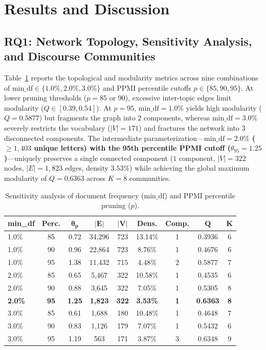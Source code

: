 \documentclass[pdflatex,sn-basic]{sn-jnl}
\begin{document}
\section{Results and Discussion}\label{sec4}
\subsection{RQ1: Network Topology, Sensitivity Analysis, and Discourse Communities}
Table~\ref{tab:sensitivity} reports the topological and modularity metrics across nine combinations of $\text{min\_df} \in \{1.0\%, 2.0\%, 3.0\%\}$ and PPMI percentile cutoffs $p \in \{85, 90, 95\}$. At lower pruning thresholds ($p=85$ or $90$), excessive inter-topic edges limit modularity ($Q \in [0.39, 0.54]$). At $p=95$, $\text{min\_df}=1.0\%$ yields high modularity ($Q=0.5877$) but fragments the graph into $2$ components, whereas $\text{min\_df}=3.0\%$ severely restricts the vocabulary ($|V|=171$) and fractures the network into $3$ disconnected components. The intermediate parameterization---\textbf{$\text{min\_df}=2.0\%$ ($\ge 1,403$ unique letters) with the 95th percentile PPMI cutoff ($\theta_{95}=1.25$)}---uniquely preserves a single connected component ($1$ component, $|V|=322$ nodes, $|E|=1,823$ edges, density $3.53\%$) while achieving the global maximum modularity of \textbf{$Q = 0.6363$} across $K=8$ communities.

\begin{table}[t]
\caption{Sensitivity analysis of document frequency ($\text{min\_df}$) and PPMI percentile pruning ($p$).}\label{tab:sensitivity}
\centering
\footnotesize
\setlength{\tabcolsep}{8pt}
\renewcommand{\arraystretch}{1.15}
\begin{tabular}{@{}lcccccccc@{}}
\toprule
\textbf{min\_df} & \textbf{Perc.} & $\boldsymbol{\theta_p}$ & $\boldsymbol{|E|}$ & $\boldsymbol{|V|}$ & \textbf{Dens.} & \textbf{Comp.} & $\boldsymbol{Q}$ & $\boldsymbol{K}$ \\
\midrule
1.0\% & 85 & 0.72 & 34,296 & 723 & 13.14\% & 1 & 0.3936 & 6 \\
1.0\% & 90 & 0.96 & 22,864 & 723 & 8.76\%  & 1 & 0.4676 & 6 \\
1.0\% & 95 & 1.38 & 11,432 & 715 & 4.48\%  & 2 & 0.5877 & 7 \\
\midrule
2.0\% & 85 & 0.65 & 5,467 & 322 & 10.58\% & 1 & 0.4535 & 6 \\
2.0\% & 90 & 0.88 & 3,645 & 322 & 7.05\%  & 1 & 0.5305 & 8 \\
\textbf{2.0\%} & \textbf{95} & \textbf{1.25} & \textbf{1,823} & \textbf{322} & \textbf{3.53\%} & \textbf{1} & \textbf{0.6363} & \textbf{8} \\
\midrule
3.0\% & 85 & 0.61 & 1,688 & 180 & 10.48\% & 1 & 0.4648 & 7 \\
3.0\% & 90 & 0.83 & 1,126 & 179 & 7.07\%  & 1 & 0.5432 & 6 \\
3.0\% & 95 & 1.19 & 563 & 171 & 3.87\%  & 3 & 0.6348 & 9 \\
\bottomrule
\end{tabular}
\end{table}
\end{document}
